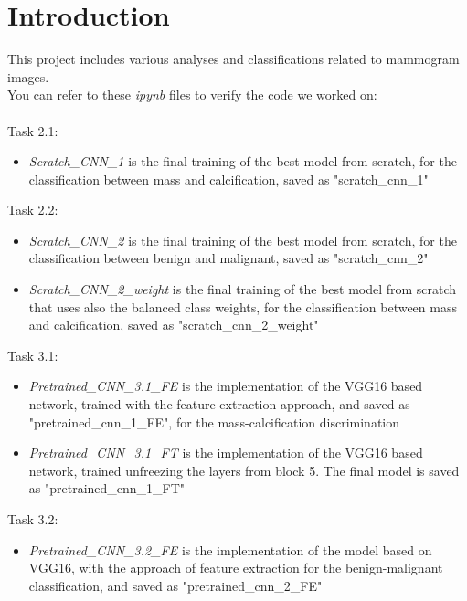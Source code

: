 \documentclass[11pt,a4paper,oneside]{article}
\begin{document}
\baselineskip 22pt


\tableofcontents\thispagestyle{empty}\clearpage

\section{Introduction}
\baselineskip 12pt

This project includes various analyses and classifications related to mammogram images. \\
You can refer to these \textit{ipynb} files to verify the code we worked on:\\ \\
Task 2.1:
\begin{itemize}
\item \textit{Scratch\_CNN\_1} is the final training of the best model from scratch, for the classification between mass and calcification, saved as "scratch\_cnn\_1"
\end{itemize}
Task 2.2:
\begin{itemize}
\item \textit{Scratch\_CNN\_2} is the final training of the best model from scratch, for the classification between benign and malignant, saved as "scratch\_cnn\_2"
\item \textit{Scratch\_CNN\_2\_weight} is the final training of the best model from scratch that uses also the balanced class weights, for the classification between mass and calcification, saved as "scratch\_cnn\_2\_weight"
\end{itemize}
Task 3.1:
\begin{itemize}
\item \textit{Pretrained\_CNN\_3.1\_FE} is the implementation of the VGG16 based network, trained with the feature extraction approach, and saved as "pretrained\_cnn\_1\_FE", for the mass-calcification discrimination
\item \textit{Pretrained\_CNN\_3.1\_FT} is the implementation of the VGG16 based network, trained unfreezing the layers from block 5. The final model is saved as "pretrained\_cnn\_1\_FT"
\end{itemize}
Task 3.2:
\begin{itemize}
\item \textit{Pretrained\_CNN\_3.2\_FE} is the implementation of the model based on VGG16, with the approach of feature extraction for the benign-malignant classification, and saved as "pretrained\_cnn\_2\_FE"
\end{itemize}
\end{document}
